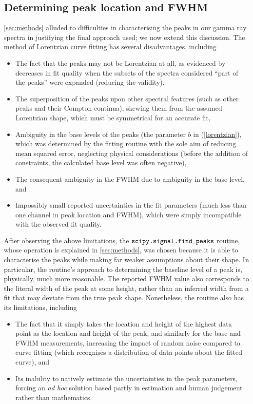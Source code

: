 \documentclass[twocol]{ametsocV6.1}
\begin{document}
\subsection{Determining peak location and FWHM}
\autoref{sec:methods} alluded to difficulties in characterising the
peaks in our gamma ray spectra in justifying the final approach used;
we now extend this discussion. The method of Lorentzian curve fitting has
several disadvantages, including
\begin{itemize}
	\item The fact that the peaks may not be Lorentzian at all,
		as evidenced by decreases in fit quality when the subsets of
		the spectra considered ``part of the peaks'' were expanded
		(reducing the validity),
	\item The superposition of the peaks upon other spectral features
		(such as other peaks and their Compton continua),
		skewing them from the assumed Lorentzian shape, which must be
		symmetrical for an accurate fit,
	\item Ambiguity in the base levels of the peaks
		(the parameter $b$ in (\ref{lorentzian}), which was determined
		by the fitting routine with the sole aim of reducing mean
		squared error, neglecting physical considerations (before the
		addition of constraints, the calculated base level was often negative),
	\item The consequent ambiguity in the FWHM due to ambiguity in the
		base level, and
	\item Impossibly small reported uncertainties in the fit parameters
		(much less than one channel in peak location and FWHM),
		which were simply incompatible with the observed fit quality.
\end{itemize}
After observing the above limitations, the $\verb|scipy.signal.find_peaks|$
routine, whose operation is explained in \autoref{sec:methods}, was chosen
because it is able to characterise the peaks while making far weaker
assumptions about their shape. In particular, the routine's approach to
determining the baseline level of a peak is, physically, much more reasonable.
The reported FWHM value also corresponds to the literal width of the
peak at some height, rather than an inferred width from a fit that may
deviate from the true peak shape. Nonetheless, the routine also has
its limitations, including
\begin{itemize}
	\item The fact that it simply takes the location and height of the
		highest data point as the location and height of the peak,
		and similarly for the base and FWHM measurements, increasing
		the impact of random noise compared to curve fitting (which recognises
		a distribution of data points about the fitted curve), and
	\item Its inability to natively estimate the uncertainties in
		the peak parameters, forcing an \emph{ad hoc} solution
		based partly in estimation and human judgement rather than
		mathematics.
\end{itemize}
\end{document}
